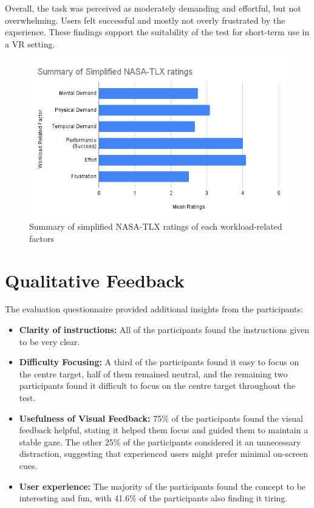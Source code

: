 \documentclass{l4proj}
\begin{document}
Overall, the task was perceived as moderately demanding and effortful, but not overwhelming. Users felt successful and mostly not overly frustrated by the experience. These findings support the suitability of the test for short-term use in a VR setting.

\newpage

\begin{figure}[!h]
    \centering
    \includegraphics[width=0.75\linewidth]{images/NASATLX barchart.png}
    \caption{Summary of simplified NASA-TLX ratings of each workload-related factors}
    \label{fig:nasabar}
\end{figure}



\section{Qualitative Feedback}
The evaluation questionnaire provided additional insights from the participants:
\begin{itemize}
    \item \textbf{Clarity of instructions:} All of the participants found the instructions given to be very clear. 
    \item \textbf{Difficulty Focusing:} A third of the participants found it easy to focus on the centre target, half of them remained neutral, and the remaining two participants found it difficult to focus on the centre target throughout the test.
    \item \textbf{Usefulness of Visual Feedback:} 75\% of the participants found the visual feedback helpful, stating it helped them focus and guided them to maintain a stable gaze. The other 25\% of the participants considered it an unnecessary distraction, suggesting that experienced users might prefer minimal on-screen cues.
    \item \textbf{User experience:} The majority of the participants found the concept to be interesting and fun, with 41.6\% of the participants also finding it tiring.
\end{itemize}
\end{document}
